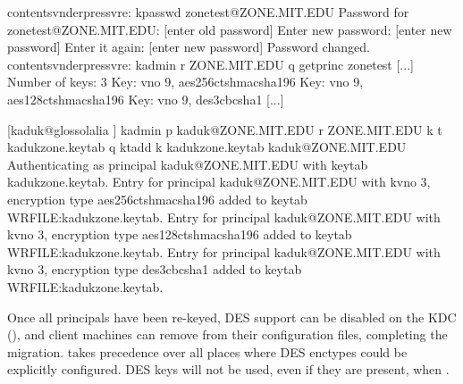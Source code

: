 \documentclass[letterpaper,10pt,english]{sphinxmanual}
\begin{document}
%
\begin{sphinxVerbatim}[commandchars=\\\{\}]
contents\PYGZhy{}vnder\PYGZhy{}pressvre:\PYGZti{}\PYGZgt{} kpasswd zonetest@ZONE.MIT.EDU
Password for zonetest@ZONE.MIT.EDU:  [enter old password]
Enter new password:                  [enter new password]
Enter it again:                      [enter new password]
Password changed.
contents\PYGZhy{}vnder\PYGZhy{}pressvre:\PYGZti{}\PYGZgt{} kadmin \PYGZhy{}r ZONE.MIT.EDU \PYGZhy{}q \PYGZsq{}getprinc zonetest\PYGZsq{}
[...]
Number of keys: 3
Key: vno 9, aes256\PYGZhy{}cts\PYGZhy{}hmac\PYGZhy{}sha1\PYGZhy{}96
Key: vno 9, aes128\PYGZhy{}cts\PYGZhy{}hmac\PYGZhy{}sha1\PYGZhy{}96
Key: vno 9, des3\PYGZhy{}cbc\PYGZhy{}sha1
[...]

[kaduk@glossolalia \PYGZti{}]\PYGZdl{} kadmin \PYGZhy{}p kaduk@ZONE.MIT.EDU \PYGZhy{}r ZONE.MIT.EDU \PYGZhy{}k \PYGZbs{}
\PYGZgt{} \PYGZhy{}t kaduk\PYGZhy{}zone.keytab \PYGZhy{}q \PYGZsq{}ktadd \PYGZhy{}k kaduk\PYGZhy{}zone.keytab kaduk@ZONE.MIT.EDU\PYGZsq{}
Authenticating as principal kaduk@ZONE.MIT.EDU with keytab kaduk\PYGZhy{}zone.keytab.
Entry for principal kaduk@ZONE.MIT.EDU with kvno 3, encryption type aes256\PYGZhy{}cts\PYGZhy{}hmac\PYGZhy{}sha1\PYGZhy{}96 added to keytab WRFILE:kaduk\PYGZhy{}zone.keytab.
Entry for principal kaduk@ZONE.MIT.EDU with kvno 3, encryption type aes128\PYGZhy{}cts\PYGZhy{}hmac\PYGZhy{}sha1\PYGZhy{}96 added to keytab WRFILE:kaduk\PYGZhy{}zone.keytab.
Entry for principal kaduk@ZONE.MIT.EDU with kvno 3, encryption type des3\PYGZhy{}cbc\PYGZhy{}sha1 added to keytab WRFILE:kaduk\PYGZhy{}zone.keytab.
\end{sphinxVerbatim}

Once all principals have been re-keyed, DES support can be disabled on the
KDC (), and client machines can remove
 from their {\hyperref[\detokenize{admin/conf_files/krb5_conf:krb5-conf-5}]{}} configuration
files, completing the migration.   takes precedence over
all places where DES enctypes could be explicitly configured.  DES keys will
not be used, even if they are present, when .
\end{document}
